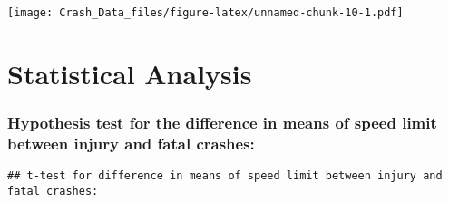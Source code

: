 \documentclass[
]{article}
\newenvironment{Shaded}{\begin{snugshade}}{\end{snugshade}}
\newcommand{\CommentTok}[1]{\textcolor[rgb]{0.56,0.35,0.01}{\textit{#1}}}
\newcommand{\DecValTok}[1]{\textcolor[rgb]{0.00,0.00,0.81}{#1}}
\newcommand{\FunctionTok}[1]{\textcolor[rgb]{0.00,0.00,0.00}{#1}}
\newcommand{\NormalTok}[1]{#1}
\newcommand{\OtherTok}[1]{\textcolor[rgb]{0.56,0.35,0.01}{#1}}
\newcommand{\SpecialCharTok}[1]{\textcolor[rgb]{0.00,0.00,0.00}{#1}}
\newcommand{\StringTok}[1]{\textcolor[rgb]{0.31,0.60,0.02}{#1}}
\begin{document}
\texttt{[image: Crash\_Data\_files/figure-latex/unnamed-chunk-10-1.pdf]}

\hypertarget{statistical-analysis}{%
\section{Statistical Analysis}\label{statistical-analysis}}

\hypertarget{hypothesis-test-for-the-difference-in-means-of-speed-limit-between-injury-and-fatal-crashes}{%
\subsubsection{Hypothesis test for the difference in means of speed
limit between injury and fatal
crashes:}\label{hypothesis-test-for-the-difference-in-means-of-speed-limit-between-injury-and-fatal-crashes}}

\begin{Shaded}
\end{Shaded}

\begin{verbatim}
## t-test for difference in means of speed limit between injury and fatal crashes:
\end{verbatim}

\begin{Shaded}
\end{Shaded}
\end{document}
